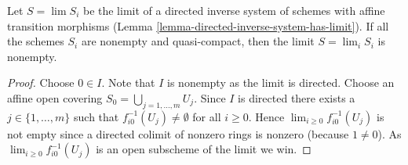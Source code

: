 \begin{lemma}
\label{lemma-limit-nonempty}
Let $S = \lim S_i$ be the limit of a directed inverse system
of schemes with affine transition morphisms
(Lemma \ref{lemma-directed-inverse-system-has-limit}).
If all the schemes $S_i$ are nonempty and quasi-compact,
then the limit $S = \lim_i S_i$ is nonempty.
\end{lemma}

\begin{proof}
Choose $0 \in I$. Note that $I$ is nonempty as the limit is directed.
Choose an affine open covering $S_0 = \bigcup_{j = 1, \ldots, m} U_j$.
Since $I$ is directed there exists a $j \in \{1, \ldots, m\}$
such that $f_{i0}^{-1}(U_j) \not = \emptyset$ for all
$i \geq 0$. Hence $\lim_{i \geq 0} f_{i0}^{-1}(U_j)$ is not
empty since a directed colimit of nonzero rings is nonzero
(because $1 \not = 0$). As $\lim_{i \geq 0} f_{i0}^{-1}(U_j)$
is an open subscheme of the limit we win.
\end{proof}
